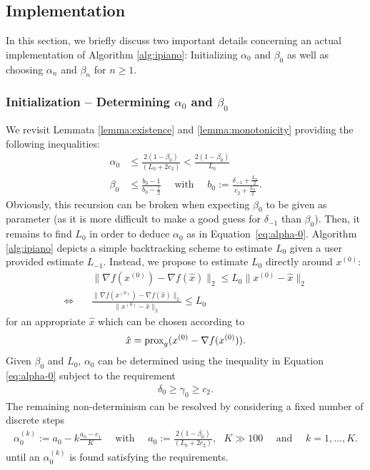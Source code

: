\documentclass[onecolumn,final,a4paper,13pt,reqno]{siamart}
\DeclareRobustCommand{\prox}[1]{%
    \ifmmode
        \text{prox}_{#1}
    \else
        $\text{prox}_{#1}$
    \fi
}
\begin{document}
\subsection{Implementation}
\label{sec:implementation}

In this section, we briefly discuss two important details concerning an actual implementation of Algorithm \ref{alg:ipiano}: Initializing $\alpha_0$ and $\beta_0$ as well as choosing $\alpha_n$ and $\beta_n$ for $n \geq 1$.

\subsubsection{Initialization -- Determining $\alpha_0$ and $\beta_0$}

We revisit Lemmata \ref{lemma:existence} and \ref{lemma:monotonicity} providing the following inequalities:
\begin{align}
	\alpha_0 &\leq \frac{2(1 - \beta_0)}{(L_0 + 2 c_2)}\label{eq:alpha-0} < \frac{2(1 - \beta_0)}{L_0}\\
	\beta_0 &\leq \frac{b_0 - 1}{b_0 - \frac{1}{2}} \quad\text{ with }\quad b_0 := \frac{\delta_{-1} + \frac{L_n}{2}}{c_2 + \frac{L_n}{2}}.
\end{align}
Obviously, this recursion can be broken when expecting $\beta_0$ to be given as parameter (as it is more difficult to make a good guess for $\delta_{-1}$ than $\beta_0$). Then, it remains to find $L_0$ in order to deduce $\alpha_0$ as in Equation~\eqref{eq:alpha-0}. Algorithm \ref{alg:ipiano} depicts a simple backtracking scheme to estimate $L_0$ given a user provided estimate $L_{-1}$. Instead, we propose to estimate $L_0$ directly around $x^{(0)}$:
\begin{align}
	&\|\nabla f(x^{(0)}) - \nabla f(\hat{x})\|_2 \leq L_0 \|x^{(0)} - \hat{x}\|_2\\
	\Leftrightarrow\quad& \frac{\|\nabla f(x^{(0)}) - \nabla f(\hat{x})\|_2}{\|x^{(0)} - \hat{x}\|_2} \leq L_0\label{eq:estimate-L}
\end{align}
for an appropriate $\hat{x}$ which can be chosen according to
\begin{align}
	\hat{x} = \prox{g}(x^{(0)} - \nabla f(x^{(0)})).
\end{align}
Given $\beta_0$ and $L_0$, $\alpha_0$ can be determined using the inequality in Equation \eqref{eq:alpha-0} subject to the requirement
\begin{align}
	\delta_0 \geq \gamma_0 \geq c_2.
\end{align}
The remaining non-determinism can be resolved by considering a fixed number of discrete steps
\begin{align}
	\alpha_0^{(k)} := a_0 - k\frac{a_0 - c_1}{K}\quad\text{ with }\quad a_0 := \frac{2(1 - \beta_0)}{(L_0 + 2 c_2)},\text{ }K \gg 100\quad\text{ and }\quad k = 1,\ldots,K.
\end{align}
until an $\alpha_0^{(k)}$ is found satisfying the requirements.
\end{document}
